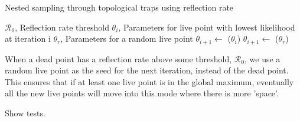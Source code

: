 \documentclass[11pt]{article}
\begin{document}
    \begin{algorithm}
        \caption{Nested sampling through topological traps using reflection rate}
        \label{alg:reflection_rate}
        \begin{algorithmic}
            \VARIABLES
            \STATE $\mathcal{R}_0$, Reflection rate threshold
            \STATE $\theta_i$, Parameters for live point with lowest likelihood at iteration i
            \STATE $\theta_r$, Parameters for a random live point
            \ENDVARIABLES
            \STATE
            \STATE $\theta_{i+1} \gets$ ($\theta_i$)
            \ELSE
            \STATE $\theta_{i+1} \gets$ ($\theta_r$)
            \ENDIF
        \end{algorithmic}
    \end{algorithm}

    When a dead point has a reflection rate above some threshold, $\mathcal{R}_0$, we use a random live point as
    the seed for the next iteration, instead of the dead point.
    This ensures that if at least one live point is in the global maximum, eventually all the new live points will move
    into this mode where there is more 'space'.

    Show tests.
\end{document}
